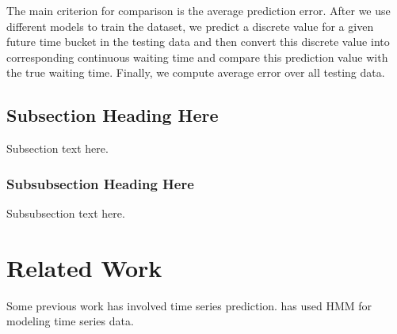 \documentclass[10pt, conference, compsocconf]{IEEEtran}
\begin{document}
The main criterion for
comparison is the average prediction error. After we use different models to train the dataset, we predict a discrete value for a given future time bucket in the testing data and then convert this discrete value into corresponding continuous waiting time and compare this prediction value with the true waiting time. Finally, we compute average error over all testing data. 



\subsection{Subsection Heading Here}
Subsection text here.


\subsubsection{Subsubsection Heading Here}
Subsubsection text here.

\section{Related Work}
Some previous work has involved time series prediction.  \cite{4840324} has used HMM for modeling time series data.  

%
%
\end{document}
